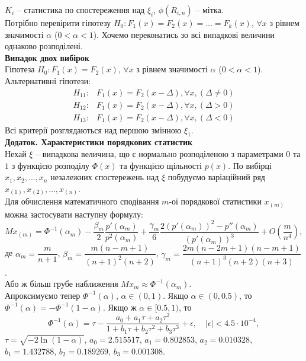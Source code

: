 $K_i$ -- статистика по спостереження над $\xi_i$, $\phi(R_{i,n})$ -- мітка. \\

Потрібно перевірити гіпотезу $H_0: F_1(x) = F_2(x) = \ldots = F_k(x)$, $\forall x$ з рівнем значимості $\alpha$ ($0 < \alpha < 1$). Хочемо переконатись зо всі випадкові величини однаково розподілені. \\

\textbf{Випадок двох вибірок} \\

Гіпотеза $H_0: F_1(x) = F_2(x)$, $\forall x$ з рівнем значимості $\alpha$ ($0 < \alpha < 1$). Альтернативні гіпотези:
\begin{align*}
    H_{11}: & F_1(x) = F_2(x - \Delta), \forall x, (\Delta \ne 0) \\
    H_{12}: & F_1(x) = F_2(x - \Delta), \forall x, (\Delta > 0) \\
    H_{13}: & F_1(x) = F_2(x - \Delta), \forall x, (\Delta < 0)
\end{align*}
Всі критерії розглядаються над першою змінною $\xi_1$. \\

\textbf{Додаток. Характеристики порядкових статистик} \\

Нехай $\xi$ -- випадкова величина, що є нормально розподіленою з параметрами $0$ та $1$ з функцією розподілу $\Phi(x)$ та функцією щільності $p(x)$. По вибірці $x_1, x_2, \ldots, x_n$ незалежних спостережень над $\xi$ побудуємо варіаційний ряд $x_{(1)}, x_{(2)}, \ldots, x_{(n)}$. \\

Для обчислення математичного сподівання $m$-ої порядкової статистики $x_{(m)}$ можна застосувати наступну формулу:
\[ M x_{(m)} = \Phi^{-1}(\alpha_m) - \dfrac{\beta_m}{2} \dfrac{p'(\alpha_m)}{p^2(\alpha_m)} + \dfrac{\gamma_m}{6} \dfrac{2 (p'(\alpha_m))^2 - p''(\alpha_m)}{(p'(\alpha_m))^3} + O \left(\dfrac{m}{n^4}\right), \]
де $\alpha_m = \dfrac{m}{n + 1}$, $\beta_m = \dfrac{m(n-m+1)}{(n+1)^2(n+2)}$, $\gamma_m = \dfrac{2m(n-2m+1)(n-m+1)}{(n+1)^3(n+2)(n+3)}$. \\

Або ж більш грубе наближення $M x_m \approx \Phi^{-1}(\alpha_m)$.  \\

Апроксимуємо тепер $\Phi^{-1}(\alpha)$, $\alpha\in (0, 1)$. Якщо $\alpha \in (0, 0.5)$, то $\Phi^{-1}(\alpha) = - \Phi^{-1}(1 - \alpha)$. Якщо ж $\alpha \in [0.5, 1)$, то \[ \Phi^{-1}(\alpha) = \tau - \dfrac{a_0 + a_1\tau + a_2\tau^2}{1 + b_1\tau + b_2\tau^2 + b_3\tau^3} + \epsilon, \quad |\epsilon| < 4.5 \cdot 10^{-4}, \] $\tau = \sqrt{-2\ln(1-\alpha)}$, $a_0 = 2.515517$, $a_1 = 0.802853$, $a_2 = 0.010328$, $b_1 = 1.432788$, $b_2 = 0.189269$, $b_3 = 0.001308$. \\

